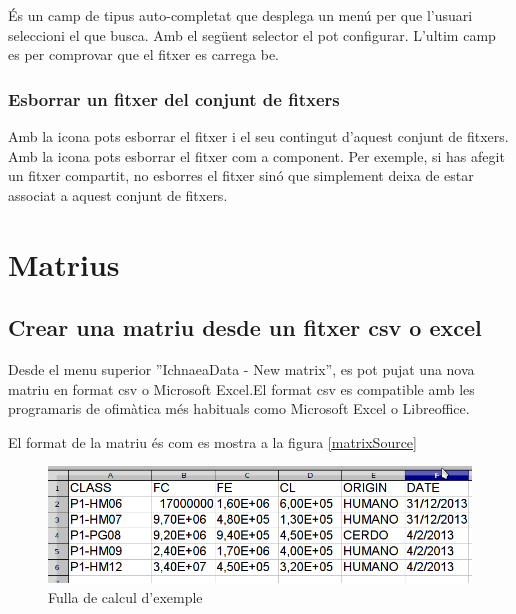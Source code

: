 \'{E}s un camp de tipus auto-completat que desplega un menú per que l'usuari seleccioni el que busca. Amb el següent selector el pot configurar. L'ultim camp es per comprovar que el fitxer es carrega be.

\subsubsection{Esborrar un fitxer del conjunt de fitxers}
Amb la icona \icontrash pots esborrar el fitxer i el seu contingut d'aquest conjunt de fitxers.\\
Amb la icona \iconremove pots esborrar el fitxer com a component. Per exemple, si has afegit un fitxer compartit, no esborres el fitxer sinó que simplement deixa de estar associat a aquest conjunt de fitxers.

\section{Matrius}

\subsection{Crear una matriu desde un fitxer csv o excel}
\label{sec:create_matrix}
Desde el menu superior ''IchnaeaData - New matrix'', es pot pujat una nova matriu en format csv o Microsoft Excel.El format csv es compatible amb les programaris de ofim\`{a}tica m\'{e}s habituals como Microsoft Excel o Libreoffice.

El format de la matriu \'{e}s com es mostra a la figura \ref{matrixSource}
\begin{figure}[h!]
  \centering
  \includegraphics[scale=0.5]{img/userguide/matrix_source.png}
  \caption{Fulla de calcul d'exemple}
  \label{fig:matrixSource}
\end{figure}

